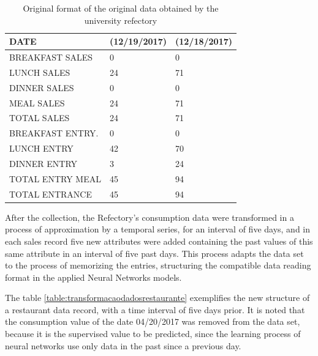         	\begin{table}[!ht]
        	    \centering
        	    \caption{Original format of the original data obtained by the university refectory}
                \begin{tabular}{l|l|l}
                    \hline
                    DATE                  & (12/19/2017) & (12/18/2017) \\ \hline
                    BREAKFAST SALES           & 0            & 0            \\
                    LUNCH SALES         & 24           & 71           \\
                    DINNER SALES         & 0            & 0            \\
                    MEAL SALES      & 24           & 71           \\
                    TOTAL SALES          & 24           & 71           \\
                    BREAKFAST ENTRY.            & 0            & 0            \\
                    LUNCH ENTRY          & 42           & 70           \\
                    DINNER ENTRY          & 3            & 24           \\
                    TOTAL ENTRY  MEAL  & 45           & 94           \\
                    TOTAL ENTRANCE         & 45           & 94           \\ \hline
                \end{tabular}
               
                \label{table:dadosrestaurante}
            \end{table}
            
            After the collection, the Refectory's consumption data were transformed in a process of approximation by a temporal series, for an interval of five days, and in each sales record five new attributes were added containing the past values of this same attribute in an interval of five past days. This process adapts the data set to the process of memorizing the entries, structuring the compatible data reading format in the applied Neural Networks models.
            
            The table \ref{table:transformacaodadosrestaurante} exemplifies the new structure of a restaurant data record, with a time interval of five days prior. It is noted that the consumption value of the date 04/20/2017 was removed from the data set, because it is the supervised value to be predicted, since the learning process of neural networks use only data in the past since a previous day.
            

